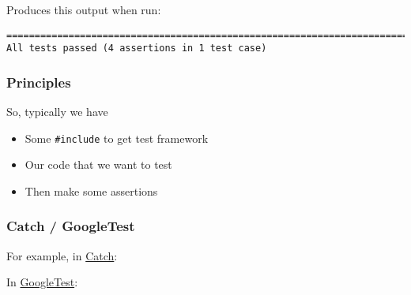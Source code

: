Produces this output when run:

\begin{verbatim}
===============================================================================
All tests passed (4 assertions in 1 test case)

\end{verbatim}

\hypertarget{principles}{%
\subsubsection{Principles}\label{principles}}

So, typically we have

\begin{itemize}
\tightlist
\item
  Some \texttt{\#include} to get test framework
\item
  Our code that we want to test
\item
  Then make some assertions
\end{itemize}

\hypertarget{catch-googletest}{%
\subsubsection{Catch / GoogleTest}\label{catch-googletest}}

For example, in \href{https://github.com/philsquared/Catch}{Catch}:

\begin{Shaded}
\begin{Highlighting}[]
\NormalTok{, }\NormalTok{ ) \{}
\NormalTok{) == }\NormalTok{ );}
\NormalTok{) == }\NormalTok{ );}
\NormalTok{    \}}
\end{Highlighting}
\end{Shaded}

In \href{https://code.google.com/p/googletest/}{GoogleTest}:

\begin{Shaded}
\begin{Highlighting}[]
    \CommentTok{// }
\NormalTok{));}
\NormalTok{));}
\NormalTok{    \}}
\end{Highlighting}
\end{Shaded}

